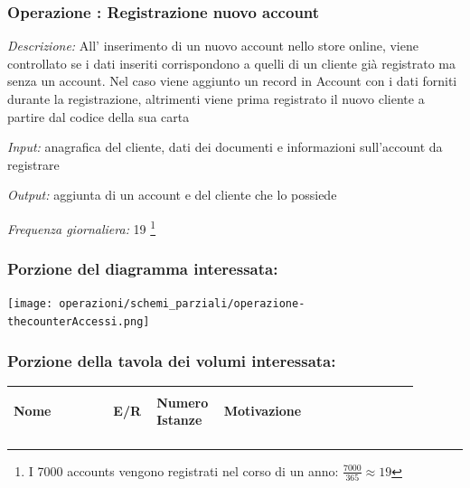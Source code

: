 \documentclass[12pt,a4paper]{article}
\begin{document}

\subsubsection*{Operazione \thecounterAccessi{}: Registrazione nuovo account}
\noindent\textit{Descrizione:} All' inserimento di un nuovo account nello store online, viene controllato se i dati inseriti corrispondono a quelli di un cliente già registrato ma senza un account. Nel caso viene aggiunto un record in Account con i dati forniti durante la registrazione, altrimenti viene prima registrato il nuovo cliente a partire dal codice della sua carta

\noindent\textit{Input:} anagrafica del cliente, dati dei documenti e informazioni sull'account da registrare

\noindent\textit{Output:} aggiunta di un account e del cliente che lo possiede

\noindent\textit{Frequenza giornaliera:} 19 \footnote{I 7000 accounts vengono registrati nel corso di un anno: $\frac{7000}{365}\approx 19$}

\subsubsection*{Porzione del diagramma interessata:}



\texttt{[image: operazioni/schemi\_parziali/operazione-\\thecounterAccessi.png]} 



\subsubsection*{Porzione della tavola dei volumi interessata:}



\begin{center}\setlength{\extrarowheight}{1.5pt}\begin{longtable}{|p{0.23\linewidth}|p{0.1\linewidth}|p{0.11\linewidth}|p{0.45\linewidth}|}



\hline \textbf{Nome}   & \begin{center}\vspace{-15pt}\textbf{E/R}\end{center} & \textbf{Numero Istanze} & \textbf{Motivazione}\\ 



\hline



\end{longtable}\end{center}
\end{document}
